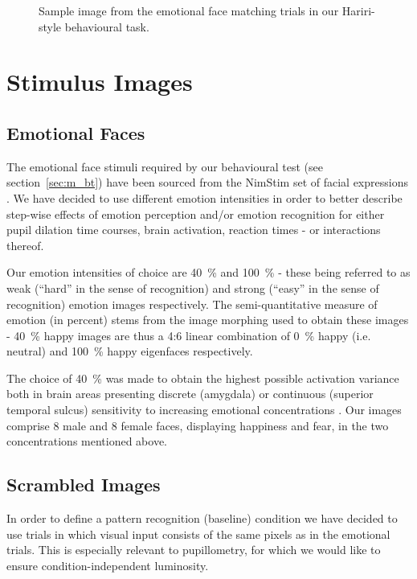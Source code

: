 	    \begin{figure}[!h]
		\caption{Sample image from the emotional face matching trials in our Hariri-style behavioural task.}
		\label{fig:m_b_2}
	    \end{figure}
			
    \section{Stimulus Images}
	\subsection{Emotional Faces}\label{sec:m_vs_ef}
	    The emotional face stimuli required by our behavioural test (see section~\ref{sec:m_bt}) have been sourced from the NimStim set of facial expressions \citep{Tottenham2009}.
	    We have decided to use different emotion intensities in order to better describe step-wise effects of emotion perception and/or emotion recognition for either pupil dilation time courses, brain activation, reaction times - or interactions thereof.
	    
	    Our emotion intensities of choice are \SI{40}{\percent} and \SI{100}{\percent} - these being referred to as weak (“hard” in the sense of recognition) and strong (“easy” in the sense of recognition) emotion images respectively.
	    The semi-quantitative measure of emotion (in percent) stems from the image morphing used to obtain these images - \SI{40}{\percent} happy images are thus a 4:6 linear combination of \SI{0}{\percent} happy (i.e. neutral) and \SI{100}{\percent} happy eigenfaces \citep{Zhang2008} respectively.
	    
	    The choice of \SI{40}{\percent} was made to obtain the highest possible activation variance both in brain areas presenting discrete (amygdala) or continuous (superior temporal sulcus) sensitivity to increasing emotional concentrations \citep{Harris2012}.
	    Our images comprise 8 male and 8 female faces, displaying happiness and fear, in the two concentrations mentioned above. 
	\subsection{Scrambled Images}\label{sec:m_vs_si}
	    In order to define a pattern recognition (baseline) condition we have decided to use trials in which visual input consists of the same pixels as in the emotional trials.
	    This is especially relevant to pupillometry, for which we would like to ensure condition-independent luminosity.
	    
